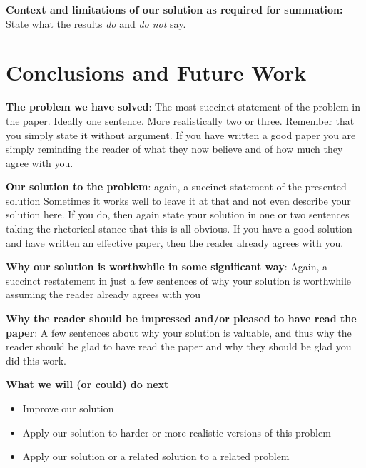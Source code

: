 \documentclass[pdf,bookmarks,colorlinks=true]{IEEEtran}
\begin{document}
\textbf{Context and limitations of our solution as required for
summation:} State what the results {\em do} and {\em do not} say.



\section{Conclusions and Future Work}
\label{sec:Conclusion}

\textbf{The problem we have solved}: The most succinct statement of the problem in the paper. Ideally one
sentence. More realistically two or three. Remember that you simply state it
without argument. If you have written a good paper you are simply reminding the
reader of what they now believe and of how much they agree with you.



\textbf{Our solution to the problem}: again, a succinct statement of the presented solution
Sometimes it works well to leave it at that and not even describe your
solution here. If you do, then again state your solution in one or two
sentences taking the rhetorical stance that this is all obvious. If you have a
good solution and have written an effective paper, then the reader already
agrees with you.

\textbf{Why our solution is worthwhile in some significant way}:
Again, a succinct restatement in just a few sentences of why your solution is
worthwhile assuming the reader already agrees with you

\textbf{Why the reader should be impressed and/or pleased to have read the paper}:
A few sentences about why your solution is valuable, and thus why the
reader should be glad to have read the paper and why they should be glad you
did this work.



\textbf{What we will (or could) do next}

\begin{itemize}
\item   Improve our solution
\item   Apply our solution to harder or more realistic versions of this problem
\item   Apply our solution or a related solution to a related problem

\end{itemize}




\end{document}
